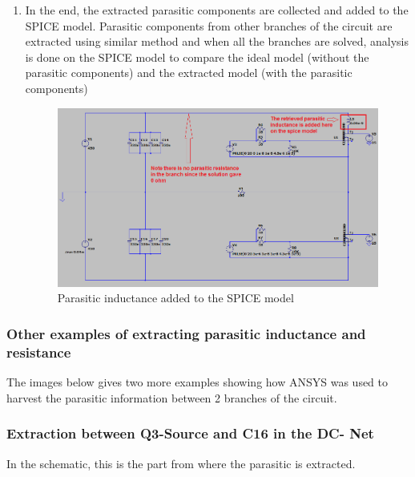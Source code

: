 \begin{enumerate}
\item In the end, the extracted parasitic components are collected and added to the SPICE model. Parasitic components from other branches of the circuit are extracted using similar method and when all the branches are solved, analysis is done on the SPICE model to compare the ideal model (without the parasitic components) and the extracted model (with the parasitic components)

\begin{figure} [H]
  \centering
  \includegraphics[width=\linewidth]{pictures/examples/spice2.png}
  \caption{Parasitic inductance added to the SPICE model}
  \label{fig:results}
\end{figure}

\end{enumerate}

\subsubsection{Other examples of extracting parasitic inductance and resistance}
\label{sec:other_ind_res}

The images below gives two more examples showing how ANSYS was used to harvest the parasitic information between 2 branches of the circuit.

\subsubsection{Extraction between Q3-Source and C16 in the DC- Net}
\label{sec:extraction_q3s_c16}

In the schematic, this is the part from where the parasitic is extracted.

